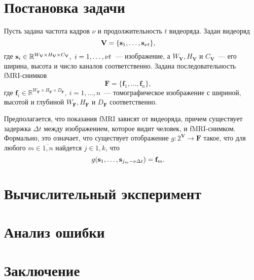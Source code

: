 \documentclass[a4paper, 12pt]{article}
\begin{document}
\section{Постановка задачи}

	Пусть задана частота кадров $\nu$ и продолжительность $t$ видеоряда. 
	Задан видеоряд
	\begin{equation}
		\mathbf{V} = \{\mathbf{s}_1, \ldots, \mathbf{s}_{\nu t}\},
	\end{equation}
	где $\mathbf{s}_i \in \mathbb{R}^{W_{\mathbf{V}} \times H_{\mathbf{V}} \times C_{\mathbf{V}}},
	\ i = 1, \ldots, \nu t$~--- изображение, а $W_{\mathbf{V}}, H_{\mathbf{V}}$ и 
	$C_{\mathbf{V}}$~--- его ширина, высота и число каналов соответственно.
	Задана последовательность fMRI-снимков
	\begin{equation}
		\mathbf{F} = \{\mathbf{f}_1, \ldots, \mathbf{f}_n\},
	\end{equation}
	где $\mathbf{f}_i \in \mathbb{R}^{W_{\mathbf{F}} \times H_{\mathbf{F}} \times D_{\mathbf{F}}},
	\ i = 1, \ldots, n$~--- томографическое изображение с шириной, высотой и глубиной
	$W_{\mathbf{F}}, H_{\mathbf{F}}$ и $D_{\mathbf{F}}$ соответственно. 

	Предполагается, что показания fMRI зависят от видеоряда, причем существует задержка
	$\Delta t$ между изображением, которое видит человек, и fMRI-снимком. Формально, это означает,
	что существует отображение $g: 2^{\mathbf{V}} \to \mathbf{F}$ такое, что для любого
	$m \in \overline{1, n}$ найдется $j \in \overline{1, k}$, что
	\begin{equation}
		g(\mathbf{s}_1, \ldots, \mathbf{s}_{j_m - \nu \Delta t}) = \mathbf{f}_m.
	\end{equation}

\section{Вычислительный эксперимент}

\section{Анализ ошибки}

\section{Заключение}



\end{document}
